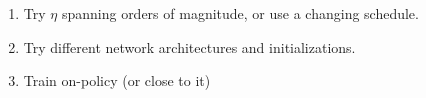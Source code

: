 \begin{enumerate}
    \item Try $\eta$ spanning orders of magnitude, or use a changing schedule.
    \item Try different network architectures and initializations.
    \item Train on-policy (or close to it)
\end{enumerate}
